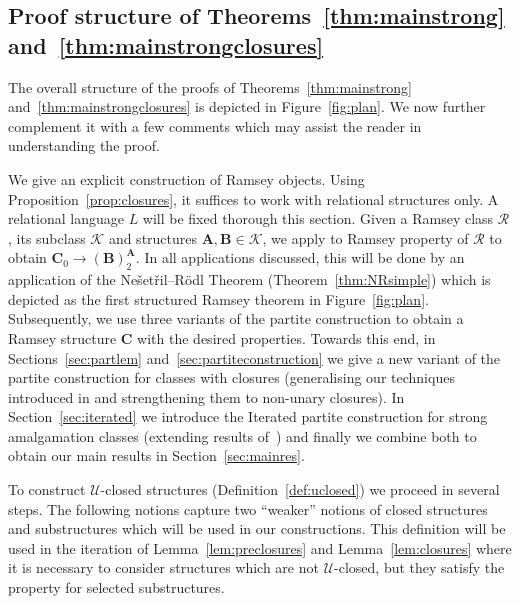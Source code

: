 \documentclass{elsarticle}
\def\str#1{\mathbf {#1}}
\def\K{{\mathcal K}}
\theoremstyle{plain}
\theoremstyle{definition}
\theoremstyle{remark}
\begin{document}
\subsection{Proof structure of Theorems~\ref{thm:mainstrong} and~\ref{thm:mainstrongclosures}}
\label{sec:ramsey}
The overall structure of the proofs of Theorems~\ref{thm:mainstrong} and~\ref{thm:mainstrongclosures}
is depicted in Figure~\ref{fig:plan}. We now further complement it with a few comments which may assist the reader in understanding the proof. 

We give an explicit construction of Ramsey objects.
Using Proposition~\ref{prop:closures}, it suffices to work with relational structures only.
A relational language $L$ will be fixed thorough this section.
Given a Ramsey class $\mathcal R$, its subclass $\mathcal K$ and structures $\str{A},\str{B}\in \K$, we apply to Ramsey property of $\mathcal R$
to obtain $\str{C}_0\longrightarrow (\str{B})^\str{A}_2$. In all applications discussed, this will be done by
an application of the Ne\v set\v ril--R\"odl Theorem (Theorem~\ref{thm:NRsimple}) which is depicted as the first structured Ramsey theorem in Figure~\ref{fig:plan}.
Subsequently, we use three variants of the partite construction to obtain a Ramsey structure $\str{C}$ with the desired properties.
Towards this end, in Sections~\ref{sec:partlem} and~\ref{sec:partiteconstruction} we give a new variant of the partite construction for
classes with closures (generalising our techniques introduced in
\cite{Hubivcka2014} and strengthening them to non-unary closures).  In Section~\ref{sec:iterated} we
introduce the Iterated partite construction  for strong amalgamation classes
(extending results of~\cite{Nevsetvril2007}) and finally we combine
both to obtain our main results in Section~\ref{sec:mainres}.

To construct $\mathcal U$-closed structures (Definition~\ref{def:uclosed}) we
proceed in several steps. The following notions capture two ``weaker'' notions
of closed structures and substructures which will be used in our constructions.
This definition will be used in the iteration of Lemma~\ref{lem:preclosures} and Lemma~\ref{lem:closures} where it is necessary to consider structures
which are not $\mathcal U$-closed, but they satisfy the property for selected substructures.
\end{document}
